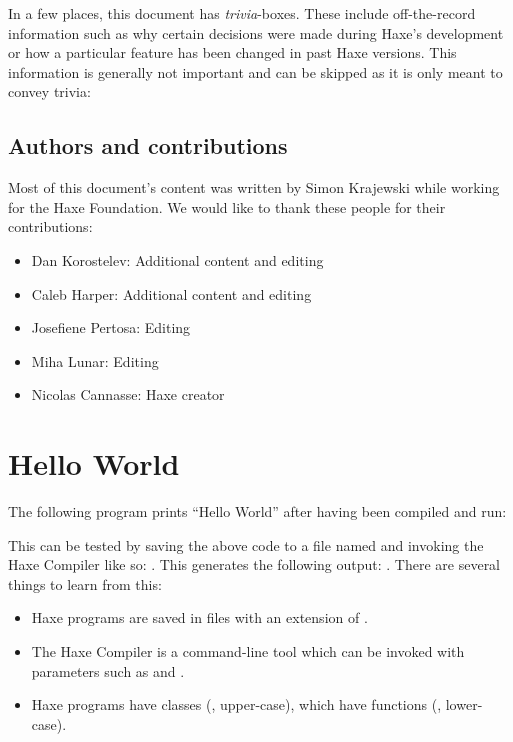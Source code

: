 \documentclass{haxe}
\begin{document}
In a few places, this document has \emph{trivia}-boxes. These include off-the-record information such as why certain decisions were made during Haxe's development or how a particular feature has been changed in past Haxe versions. This information is generally not important and can be skipped as it is only meant to convey trivia:


\subsection{Authors and contributions}
\label{introduction-authors-and-contributions}

Most of this document's content was written by Simon Krajewski while working for the Haxe Foundation. We would like to thank these people for their contributions:

\begin{itemize}
	\item Dan Korostelev: Additional content and editing
	\item Caleb Harper: Additional content and editing
	\item Josefiene Pertosa: Editing
	\item Miha Lunar: Editing
	\item Nicolas Cannasse: Haxe creator
\end{itemize}



\section{Hello World}
\label{introduction-hello-world}

The following program prints ``Hello World'' after having been compiled and run:

This can be tested by saving the above code to a file named  and invoking the Haxe Compiler like so: . This generates the following output: . There are several things to learn from this:

\begin{itemize}
	\item Haxe programs are saved in files with an extension of .
	\item The Haxe Compiler is a command-line tool which can be invoked with parameters such as  and .
	\item Haxe programs have classes (, upper-case), which have functions (, lower-case). 
\end{itemize}
\end{document}
